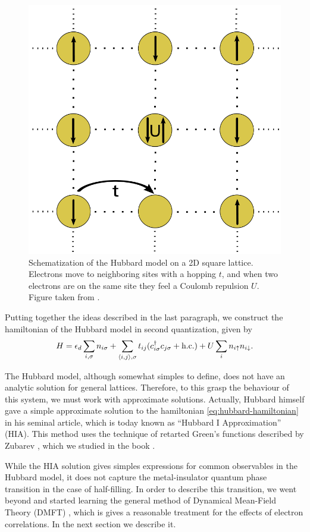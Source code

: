 \documentclass[12pt]{report}
\begin{document}
\n

\begin{figure}[H]
\centering
\includegraphics[width=0.4\linewidth]{fig/hubbard_model-scheme.png}
\caption{Schematization of the Hubbard model on a 2D square lattice. Electrons move to neighboring sites with a hopping $t$, and when two electrons are on the same site they feel a Coulomb repulsion $U$. Figure taken from \cite{thesis_dmft_graz}.}
\label{fig:hubbard_model-scheme}
\end{figure}

Putting together the ideas described in the last paragraph, we construct the hamiltonian of the Hubbard model in second quantization, given by
\begin{equation} \label{eq:hubbard-hamiltonian}
H = \epsilon_d \sum_{i, \sigma} n_{i\sigma} +  \sum_{\left\langle i , j \right\rangle, \sigma} t_{ij} (c_{i\sigma}^\dagger c_{j\sigma} + \text{h.c.})
+ U \sum_{i} n_{i\uparrow} n_{i\downarrow}.
\end{equation}

\n

The Hubbard model, although somewhat simples to define, does not have an analytic solution for general lattices. Therefore, to this grasp the behaviour of this system, we must work with approximate solutions. Actually, Hubbard himself gave a simple approximate solution to the hamiltonian \ref{eq:hubbard-hamiltonian} in his seminal article, which is today known as ``Hubbard I Approximation'' (HIA). This method uses the technique of retarted Green's functions described by Zubarev \cite{zubarev1960}, which we studied in the book \cite{bruus}.

\n

While the HIA solution gives simples expressions for common observables in the Hubbard model, it does not capture the metal-insulator quantum phase transition in the case of half-filling. In order to describe this transition, we went beyond and started learning the general method of Dynamical Mean-Field Theory (DMFT) \cite{georges1996}, which is gives a reasonable treatment for the effects of electron correlations. In the next section we describe it.
\end{document}
